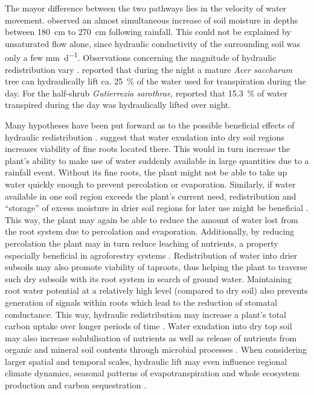 The mayor difference between the two pathways lies in the velocity of water movement.  \textcite{burgess_tree_2001} observed an almost simultaneous increase of soil moisture in depths between \SI{180}{cm} to \SI{270}{cm} following rainfall.  This could not be explained by unsaturated flow alone, since hydraulic conductivity of the surrounding soil was only a few \si{\milli\metre\per\day}.  Observations concerning the magnitude of hydraulic redistribution vary \parencite{bayala_hydraulic_2008}.  \textcite{emerman_hydraulic_1996} reported that during the night a mature \emph{Acer saccharum} tree can hydraulically lift ca. \SI{25}{\percent} of the water used for transpiration during the day.  For the half-shrub \emph{Gutierrezia sarothrae}, \textcite{wan_does_1993} reported that \SI{15.3}{\percent} of water transpired during the day was hydraulically lifted over night.

Many hypotheses have been put forward as to the possible beneficial effects of hydraulic redistribution \parencite{caldwell_hydraulic_1998}.  \textcite{burgess_redistribution_1998} suggest that water exudation into dry soil regions increases viability of fine roots located there.  This would in turn increase the plant’s ability to make use of water suddenly available in large quantities due to a rainfall event.  Without its fine roots, the plant might not be able to take up water quickly enough to prevent percolation or evaporation.  Similarly, if water available in one soil region exceeds the plant’s current need, redistribution and ``storage'' of excess moisture in drier soil regions for later use might be beneficial \parencite{richards_hydraulic_1987}.  This way, the plant may again be able to reduce the amount of water lost from the root system due to percolation and evaporation.  Additionally, by reducing percolation the plant may in turn reduce leaching of nutrients, a property especially beneficial in agroforestry systems \parencite{burgess_redistribution_1998}.  Redistribution of water into drier subsoils may also promote viability of taproots, thus helping the plant to traverse such dry subsoils with its root system in search of ground water.  Maintaining root water potential at a relatively high level (compared to dry soil) also prevents generation of signals within roots which lead to the reduction of stomatal conductance.  This way, hydraulic redistribution may increase a plant’s total carbon uptake over longer periods of time \parencite{warren_hydraulic_2007}.  Water exudation into dry top soil may also increase solubilisation of nutrients as well as release of nutrients from organic and mineral soil contents through microbial processes \parencite{pate_assessing_1999,ryel_hydraulic_2002}.  When considering larger spatial and temporal scales, hydraulic lift may even influence regional climate dynamics, seasonal patterns of evapotranspiration and whole ecosystem production and carbon sequestration \parencite{warren_hydraulic_2007}.

